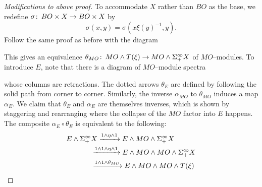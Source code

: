 \begin{proof}[Modifications to above proof]
To accommodate \(X\) rather than \(BO\) as the base, we redefine \(\sigma\colon\thinspace BO \times X \to BO \times X\) by \[\sigma(x, y) = \sigma(x \xi(y)^{-1}, y).\]  Follow the same proof as before with the diagram
\begin{center}
\end{center}
This gives an equivalence \(\theta_{MO}\colon\thinspace MO \wedge T(\xi) \rightarrow MO \wedge \Sigma^\infty_+ X\) of \(MO\)--modules.  To introduce \(E\), note that there is a diagram of \(MO\)--module spectra
\begin{center}
\end{center}
whose columns are retractions.  The dotted arrows \(\theta_E\) are defined by following the solid path from corner to corner.  Similarly, the inverse \(\alpha_{MO}\) to \(\theta_{MO}\) induces a map \(\alpha_E\).  We claim that \(\theta_E\) and \(\alpha_E\) are themselves inverses, which is shown by staggering and rearranging where the collapse of the \(MO\) factor into \(E\) happens.  The composite \(\alpha_E \circ \theta_E\) is equivalent to the following:
\begin{align*}
E \sm \Susp^\infty_+ & X \xrightarrow{1 \sm \eta \sm 1} E \sm MO \sm \Susp^\infty_+ X \\
& \xrightarrow{1 \sm 1 \sm \eta \sm 1} E \sm MO \sm MO \sm \Susp^\infty_+ X \\
& \xrightarrow{1 \sm 1 \sm \theta_{MO}} E \sm MO \sm MO \sm T(\xi) \\

\end{align*}
\end{proof}

